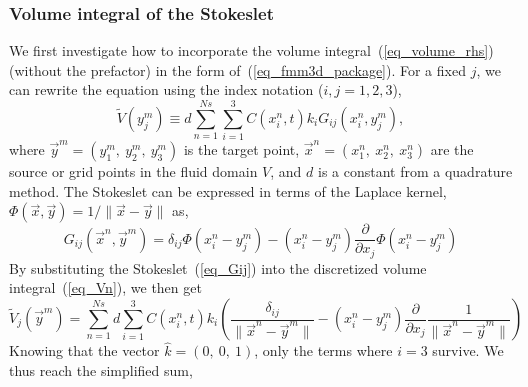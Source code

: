 \subsubsection{Volume integral of the Stokeslet}
We first investigate how to incorporate the volume integral~(\ref{eq_volume_rhs}) (without the prefactor) in the form of~(\ref{eq_fmm3d_package}). For a fixed $j$, we can rewrite the equation using the index notation ($i, j = 1,2,3$), 
\begin{equation}
	\tilde{V}(y_j^m)
	\equiv
	 d\sum_{n = 1}^{Ns} \sum_{i = 1}^{3}
	 C(x^n_i,  t)k_iG_{ij}(x_i^n,y_j^m),
	\label{eq_Vn}
\end{equation}
where $\vec{y}^m = (y_1^m, \ y_2^m, \ y_3^m)$ is the target point, $\vec{x}^n = (x_1^n, \ x_2^n, \ x_3^n)$ are the source or grid points in the fluid domain $V$, and $d$ is a constant from a quadrature method.
The Stokeslet can be expressed in terms of the Laplace kernel, $\Phi(\vec{x},\vec{y}) = 1/{\| \vec{x} - \vec{y} \|}$ as,
\begin{equation}
	G_{ij}(\vec{x}^n, \vec{y}^m)
	 =  \delta_{ij} \Phi \left(  x_i^n - y_j^m\right)
	 - \left( x_i^n - y_j^m \right)
	 \frac{\partial}{\partial  x_j}
	\Phi \left(  x_i^n - y_j^m\right)
	\label{eq_Gij}
\end{equation}
By substituting the Stokeslet~(\ref{eq_Gij}) into the discretized volume integral~(\ref{eq_Vn}), we then get
\begin{equation}
	\tilde{V}_j (\vec{y}^m)=
	\sum_{n=1}^{Ns}
	d
   \sum_{i = 1}^{3} C(x^n_i,  t)k_i
  	\left(
  	\frac{\delta_{ij}}{\| \vec{x}^n - \vec{y}^m \|}
  	- \left( x_i^n - y_j^m \right)
  	 \frac{\partial}{\partial x_j}
  	\frac{1}{\| \vec{x}^n - \vec{y}^m \|}
  	\right)
 \label{eq_frm_lplc_stokes}
\end{equation}
Knowing that the vector $\hat{k} = (0, \ 0, \ 1)$, only the terms where $i = 3$ survive. We thus reach the simplified sum,

